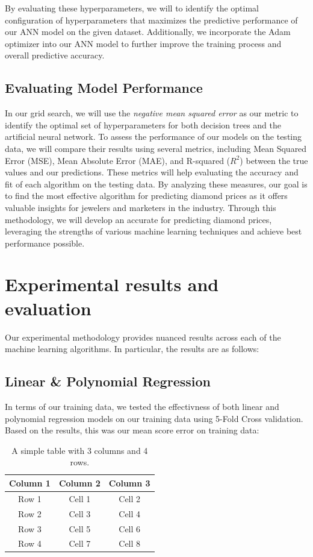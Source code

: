 \documentclass[conference]{IEEEtran}
\begin{document}
By evaluating these hyperparameters, we will to identify the optimal configuration of hyperparameters that maximizes the predictive performance of our ANN model on the given dataset. Additionally, we incorporate the Adam optimizer into our ANN model to further improve the training process and overall predictive accuracy.


\subsection{Evaluating Model Performance}

In our grid search, we will use the \emph{negative mean squared error} as our metric to identify the optimal set of hyperparameters for both decision trees and the artificial neural network. To assess the performance of our models on the testing data, we will compare their results using several metrics, including Mean Squared Error (MSE), Mean Absolute Error (MAE), and R-squared ($R^2$) between the true values and our predictions. These metrics will help evaluating the accuracy and fit of each algorithm on the testing data. By analyzing these measures, our goal is to find the most effective algorithm for predicting diamond prices as it offers valuable insights for jewelers and marketers in the industry. Through this methodology, we will develop an accurate for predicting diamond prices, leveraging the strengths of various machine learning techniques and achieve best performance possible.

\section{Experimental results and evaluation}

Our experimental methodology provides nuanced results across each of the machine learning algorithms. In particular, the results are as follows:

\subsection{Linear \& Polynomial Regression}

In terms of our training data, we tested the effectivness of both linear and polynomial regression models on our training data using 5-Fold Cross validation. Based on the results, this was our mean score error on training data:

\begin{table}[h]
\centering
\begin{tabular}{|c|c|c|}
\hline
Column 1 & Column 2 & Column 3 \\
\hline
Row 1 & Cell 1 & Cell 2 \\
Row 2 & Cell 3 & Cell 4 \\
Row 3 & Cell 5 & Cell 6 \\
Row 4 & Cell 7 & Cell 8 \\
\hline
\end{tabular}
\caption{A simple table with 3 columns and 4 rows.}
\label{tab:mytable}
\end{table}
\end{document}

